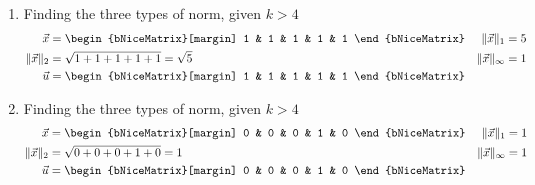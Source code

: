 \begin{enumerate}
    \item Finding the three types of norm, given $ k > 4 $
          \begin{align}
              \vec{x}                      & = \begin{bNiceMatrix}[margin]
                                                   1 & 1 & 1 & 1 & 1
                                               \end{bNiceMatrix}         &
              \lVert \vec{x} \rVert_1      & = 5                                     \\
              \lVert \vec{x} \rVert_2      & = \sqrt{1 + 1 + 1 + 1 + 1} = \sqrt{5} &
              \lVert \vec{x} \rVert_\infty & = 1                                     \\
              \vec{u}                      & = \begin{bNiceMatrix}[margin]
                                                   1 & 1 & 1 & 1 & 1
                                               \end{bNiceMatrix}
          \end{align}

    \item Finding the three types of norm, given $ k > 4 $
          \begin{align}
              \vec{x}                      & = \begin{bNiceMatrix}[margin]
                                                   0 & 0 & 0 & 1 & 0
                                               \end{bNiceMatrix}  &
              \lVert \vec{x} \rVert_1      & = 1                              \\
              \lVert \vec{x} \rVert_2      & = \sqrt{0 + 0 + 0 + 1 + 0} = 1 &
              \lVert \vec{x} \rVert_\infty & = 1                              \\
              \vec{u}                      & = \begin{bNiceMatrix}[margin]
                                                   0 & 0 & 0 & 1 & 0
                                               \end{bNiceMatrix}
          \end{align}


\end{enumerate}
